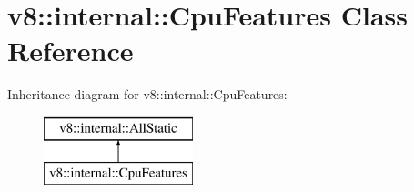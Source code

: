 \hypertarget{classv8_1_1internal_1_1_cpu_features}{}\section{v8\+:\+:internal\+:\+:Cpu\+Features Class Reference}
\label{classv8_1_1internal_1_1_cpu_features}
Inheritance diagram for v8\+:\+:internal\+:\+:Cpu\+Features\+:\begin{figure}[H]
\begin{center}
\leavevmode
\includegraphics[height=2.000000cm]{classv8_1_1internal_1_1_cpu_features}
\end{center}
\end{figure}
